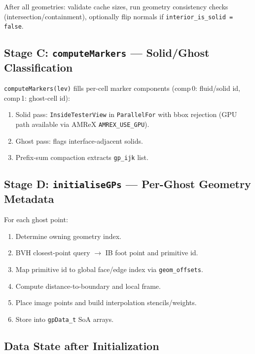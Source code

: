 \documentclass[11pt,a4paper]{article}
\begin{document}
After all geometries: validate cache sizes, run geometry consistency checks
(intersection/containment), optionally flip normals if \texttt{interior\_is\_solid = false}.

\subsection{Stage C: \texttt{computeMarkers} --- Solid/Ghost Classification}

\texttt{computeMarkers(lev)} fills per-cell marker components (comp\,0: fluid/solid id,
comp\,1: ghost-cell id):

\begin{enumerate}[nosep]
  \item Solid pass: \texttt{InsideTesterView} in \texttt{ParallelFor} with bbox rejection
        (GPU path available via AMReX \texttt{AMREX\_USE\_GPU}).
  \item Ghost pass: flags interface-adjacent solids.
  \item Prefix-sum compaction extracts \texttt{gp\_ijk} list.
\end{enumerate}

\subsection{Stage D: \texttt{initialiseGPs} --- Per-Ghost Geometry Metadata}

For each ghost point:

\begin{enumerate}[nosep]
  \item Determine owning geometry index.
  \item BVH closest-point query $\to$ IB foot point and primitive id.
  \item Map primitive id to global face/edge index via \texttt{geom\_offsets}.
  \item Compute distance-to-boundary and local frame.
  \item Place image points and build interpolation stencils/weights.
  \item Store into \texttt{gpData\_t} SoA arrays.
\end{enumerate}

\subsection{Data State after Initialization}
\end{document}
